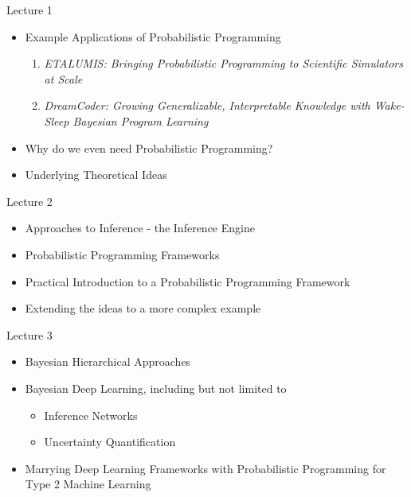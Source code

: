 \documentclass[AERbeamer%
              ,optEnglish%
              ,optBiber%
              ,optBibstyleAlphabetic%
              ,optBeamerClassicFormat%
              ]{AERlatex}%
\begin{document}
\begin{frame}[c]{Lecture 1}
    \centering
    \begin{itemize}
        \item Example Applications of Probabilistic Programming
        \begin{enumerate}
            \item \textit{ETALUMIS: Bringing Probabilistic Programming to Scientific Simulators at Scale}
            \item \textit{DreamCoder: Growing Generalizable, Interpretable Knowledge with Wake-Sleep Bayesian Program Learning}
        \end{enumerate}
        \item Why do we even need Probabilistic Programming?
        \item Underlying Theoretical Ideas
    \end{itemize}
\end{frame}


\begin{frame}[c]{Lecture 2}
    \centering
    \begin{itemize}
        \item Approaches to Inference - the Inference Engine
        \item Probabilistic Programming Frameworks
        \item Practical Introduction to a Probabilistic Programming Framework
        \item Extending the ideas to a more complex example
    \end{itemize}
\end{frame}


\begin{frame}[c]{Lecture 3}
    \centering
    \begin{itemize}
        \item Bayesian Hierarchical Approaches
        \item Bayesian Deep Learning, including but not limited to
        \begin{itemize}
            \item Inference Networks
            \item Uncertainty Quantification
        \end{itemize}
        \item Marrying Deep Learning Frameworks with Probabilistic Programming for Type 2 Machine Learning
    \end{itemize}
\end{frame}
\end{document}
